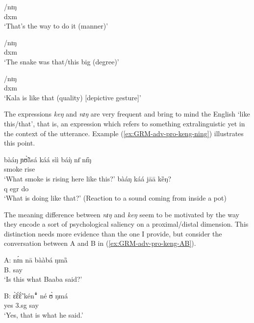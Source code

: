 \begin{exe}
\begin{exe}
\begin{exe}
{\begin{exe}
\begin{exe}
\begin{exe}
\begin{exe}
\begin{exe}
\begin{exe}
\begin{exe}
\begin{xlist}
\begin{exe}
\begin{exe}
\begin{exe}
\begin{exe}
\begin{exe}
\begin{exe}
\begin{exe}
\begin{exe}
\begin{exe}
\begin{exe}
\begin{exe}
\begin{exe}
\begin{exe}
\begin{exe}
\begin{exe}
\ea\label{ex:GRM-dxm-}
 \ea\label{ex:GRM-dxm-}
/{nɪŋ}  \\
{\sc dxm} \\
\glt `That's the way to do it (manner)'  

  \ex\label{ex:GRM-dxm-}
/{nɪŋ}  \\
{\sc dxm} \\
\glt `The snake was that/this big (degree)'  

  \ex\label{ex:GRM-dxm-}
/{nɪŋ}  \\
{\sc dxm} \\
\glt `Kala is like that (quality) [depictive gesture]'  

\z 
 \z   

The expressions  {\it keŋ} and {\it nɪŋ} are very frequent  and bring
to mind the  English  `like this/that',  that is,  an expression which 
refers to something extralinguistic yet in  the context of the utterance. 
Example (\ref{ex:GRM-adv-pro-keng-ning}) illustrates this point.


\ea\label{ex:GRM-adv-pro-keng-ning}

 \ea\label{ex:GRM-adv-pro-ning}
\gll bàáŋ ɲʊ̃̀ã̀sá káá sìì báŋ̀ nɪ̄ nɪ̏ŋ\\
{\q}  smoke  {\egr} rise {\dem} {\postp} {\dxm}\\
\glt `What smoke is rising here like this?'  
  \ex\label{ex:GRM-adv-pro-keng}
 \gll bàáŋ káá jāā kȅŋ?\\
  {\sc q} {\sc egr} do  {\dxm}\\ 
 \glt `What is doing like that?' (Reaction to a sound coming from inside a pot)

\z 
 \z   

The meaning difference between   {\it nɪŋ}  and {\it 
keŋ} seem to be 
motivated by the way they  encode a sort of psychological saliency on a
proximal/distal dimension. This distinction needs more evidence than the one I
provide,  but consider the conversation between A and B in
(\ref{ex:GRM-adv-pro-keng-AB}). 


\ea\label{ex:GRM-adv-pro-keng-AB}

 \ea\label{ex:GRM-adv-pro-A}
\gll A: nɪ́n nā bààbá ŋmȁ\\
 {} {\dxm} {\foc} B. say\\
\glt `Is this what Baaba said?'

  \ex\label{ex:GRM-adv-pro-B}
 \gll B: ɛ̃̀ɛ̃́ɛ̃̀ kén{\T ꜜ} né ʊ̀ ŋmá\\
 {} yes {\dxm} {\foc} {\sc 3.sg} say\\
\glt `Yes, that is what he said.'
 

\end{exe}
\end{exe}
\end{exe}
\end{exe}
\end{exe}
\end{exe}
\end{exe}
\end{exe}
\end{exe}
\end{exe}
\end{exe}
\end{exe}
\end{exe}
\end{exe}
\end{exe}
\end{xlist}
\end{exe}
\end{exe}
\end{exe}
\end{exe}
\end{exe}
\end{exe}
\end{exe}}
\end{exe}
\end{exe}
\end{exe}
